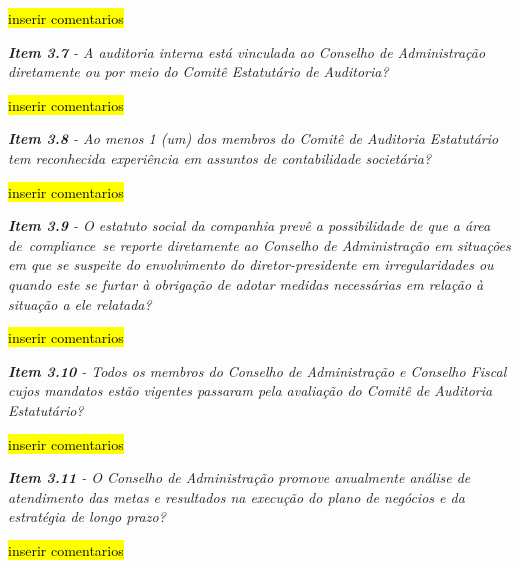 \hl{inserir comentarios}

\begin{framed}
\noindent\textit{\textbf{Item 3.7} - A auditoria interna está vinculada ao Conselho de Administração diretamente ou por meio do Comitê Estatutário de Auditoria?}
\end{framed}

\hl{inserir comentarios}

\begin{framed}
\noindent\textit{\textbf{Item 3.8} - Ao menos 1 (um) dos membros do Comitê de Auditoria Estatutário tem reconhecida experiência em assuntos de contabilidade societária?}
\end{framed}

\hl{inserir comentarios}

\begin{framed}
\noindent\textit{\textbf{Item 3.9} - O estatuto social da companhia prevê a possibilidade de que a área de compliance se reporte diretamente ao Conselho de Administração em situações em que se suspeite do envolvimento do diretor-presidente em irregularidades ou quando este se furtar à obrigação de adotar medidas necessárias em relação à situação a ele relatada?}
\end{framed}

\hl{inserir comentarios}

\begin{framed}
\noindent\textit{\textbf{Item 3.10} - Todos os membros do Conselho de Administração e Conselho Fiscal cujos mandatos estão vigentes passaram pela avaliação do Comitê de Auditoria Estatutário?}
\end{framed}

\hl{inserir comentarios}


\begin{framed}
\noindent\textit{\textbf{Item 3.11} - O Conselho de Administração promove anualmente análise de atendimento das metas e resultados na execução do plano de negócios e da estratégia de longo prazo?}
\end{framed}

\hl{inserir comentarios}

